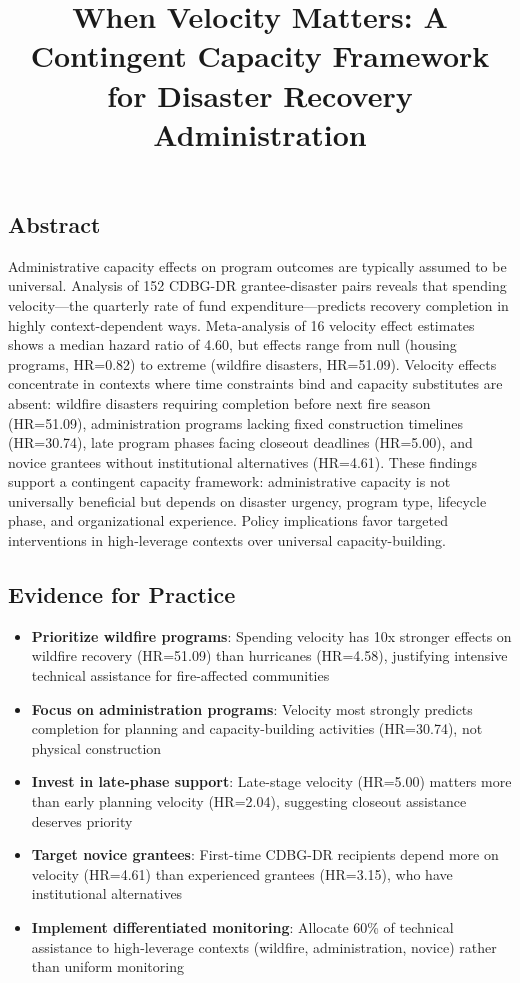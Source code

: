 \documentclass[
  12pt,
  letterpaper,
]{article}
\title{When Velocity Matters: A Contingent Capacity Framework for
Disaster Recovery Administration}
\author{}
\date{}
\providecommand{\tightlist}{%
  \setlength{\itemsep}{0pt}\setlength{\parskip}{0pt}}
\begin{document}
\maketitle


\subsection*{Abstract}\label{abstract}

Administrative capacity effects on program outcomes are typically
assumed to be universal. Analysis of 152 CDBG-DR grantee-disaster pairs
reveals that spending velocity---the quarterly rate of fund
expenditure---predicts recovery completion in highly context-dependent
ways. Meta-analysis of 16 velocity effect estimates shows a median
hazard ratio of 4.60, but effects range from null (housing programs,
HR=0.82) to extreme (wildfire disasters, HR=51.09). Velocity effects
concentrate in contexts where time constraints bind and capacity
substitutes are absent: wildfire disasters requiring completion before
next fire season (HR=51.09), administration programs lacking fixed
construction timelines (HR=30.74), late program phases facing closeout
deadlines (HR=5.00), and novice grantees without institutional
alternatives (HR=4.61). These findings support a contingent capacity
framework: administrative capacity is not universally beneficial but
depends on disaster urgency, program type, lifecycle phase, and
organizational experience. Policy implications favor targeted
interventions in high-leverage contexts over universal
capacity-building.

\subsection*{Evidence for Practice}\label{evidence-for-practice}

\begin{itemize}
\tightlist
\item
  \textbf{Prioritize wildfire programs}: Spending velocity has 10x
  stronger effects on wildfire recovery (HR=51.09) than hurricanes
  (HR=4.58), justifying intensive technical assistance for fire-affected
  communities
\item
  \textbf{Focus on administration programs}: Velocity most strongly
  predicts completion for planning and capacity-building activities
  (HR=30.74), not physical construction
\item
  \textbf{Invest in late-phase support}: Late-stage velocity (HR=5.00)
  matters more than early planning velocity (HR=2.04), suggesting
  closeout assistance deserves priority
\item
  \textbf{Target novice grantees}: First-time CDBG-DR recipients depend
  more on velocity (HR=4.61) than experienced grantees (HR=3.15), who
  have institutional alternatives
\item
  \textbf{Implement differentiated monitoring}: Allocate 60\% of
  technical assistance to high-leverage contexts (wildfire,
  administration, novice) rather than uniform monitoring
\end{itemize}
\end{document}
